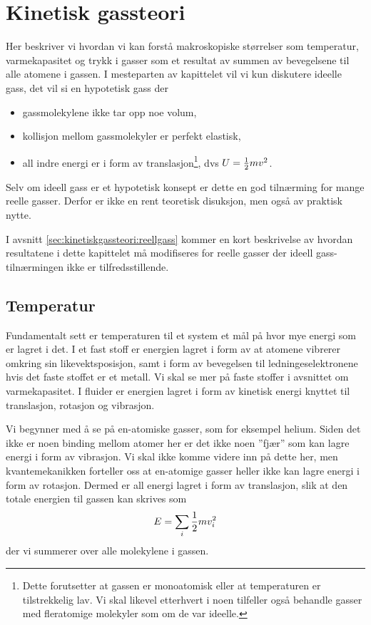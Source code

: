 \section{Kinetisk gassteori}
Her beskriver vi hvordan vi kan forstå makroskopiske størrelser som temperatur, varmekapasitet og trykk i gasser som et resultat av summen av bevegelsene til alle atomene i gassen. I mesteparten av kapittelet vil vi kun diskutere ideelle gass, det vil si en hypotetisk gass der
\begin{itemize}
	\item
	gassmolekylene ikke tar opp noe volum,
	\item
	kollisjon mellom gassmolekyler er perfekt elastisk,
	\item
	all indre energi er i form av translasjon\footnote{Dette forutsetter at gassen er  monoatomisk eller at temperaturen er tilstrekkelig lav. Vi skal likevel etterhvert i noen tilfeller også behandle gasser med fleratomige molekyler som om de var ideelle.}, dvs $U = \frac{1}{2} mv^2$.
\end{itemize}
Selv om ideell gass er et hypotetisk konsept er dette en god tilnærming for mange reelle gasser. Derfor er ikke en rent teoretisk disuksjon, men også av praktisk nytte.

I avsnitt \ref{sec:kinetiskgassteori:reellgass} kommer en kort beskrivelse av hvordan resultatene i dette kapittelet må modifiseres for reelle gasser der ideell gass-tilnærmingen ikke er tilfredsstillende.

\subsection{Temperatur}
\label{sec:kinetiskgassteori:temperatur}
Fundamentalt sett er temperaturen til et system et mål på hvor mye energi som er lagret i det. I et fast stoff er energien lagret i form av at atomene vibrerer omkring sin likevektsposisjon, samt i form av bevegelsen til ledningeselektronene hvis det faste stoffet er et metall. Vi skal se mer på faste stoffer i avsnittet om varmekapasitet. I fluider er energien lagret i form av kinetisk energi knyttet til translasjon, rotasjon og vibrasjon. 

Vi begynner med å se på en-atomiske gasser, som for eksempel helium. Siden det ikke er noen binding mellom atomer her er det ikke noen 
''fjær'' som kan lagre energi i form av vibrasjon. Vi skal ikke komme videre inn på dette her, men kvantemekanikken forteller oss at en-atomige gasser heller ikke kan lagre energi i form av rotasjon. Dermed er all energi lagret i form av translasjon, slik at den totale energien til gassen kan skrives som
\begin{displaymath}
	E = \sum_i \frac{1}{2} mv_i^2
\end{displaymath}
der vi summerer over alle molekylene i gassen.

